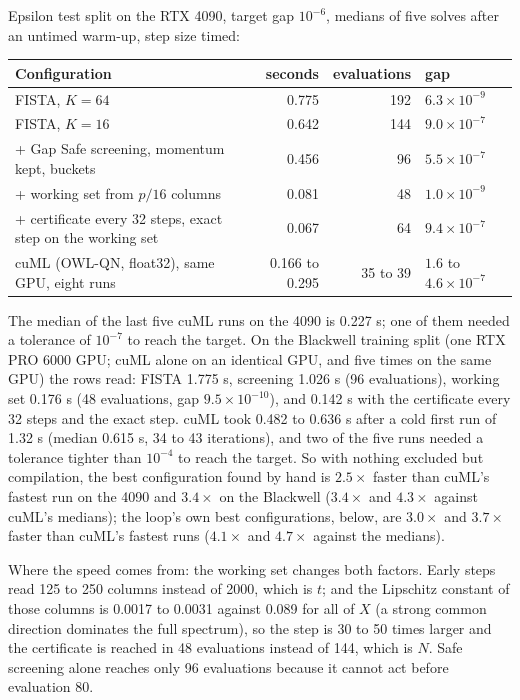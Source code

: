 Epsilon test split on the RTX 4090, target gap $10^{-6}$, medians of five
solves after an untimed warm-up, step size timed:

\begin{center}
\small
\begin{tabular}{lrrl}
\toprule
Configuration & seconds & evaluations & gap \\
\midrule
FISTA, $K=64$ & 0.775 & 192 & $6.3\times10^{-9}$ \\
FISTA, $K=16$ & 0.642 & 144 & $9.0\times10^{-7}$ \\
\quad + Gap Safe screening, momentum kept, buckets & 0.456 & 96 & $5.5\times10^{-7}$ \\
\quad + working set from $p/16$ columns & 0.081 & 48 & $1.0\times10^{-9}$ \\
\quad + certificate every 32 steps, exact step on the working set & 0.067 & 64 & $9.4\times10^{-7}$ \\
cuML (OWL-QN, float32), same GPU, eight runs & 0.166 to 0.295 & 35 to 39 & $1.6$ to $4.6\times10^{-7}$ \\
\bottomrule
\end{tabular}
\end{center}

The median of the last five cuML runs on the 4090 is 0.227 s; one of them
needed a tolerance of $10^{-7}$ to reach the target. On the Blackwell training
split (one RTX PRO 6000 GPU; cuML alone on an identical GPU, and five times on
the same GPU) the rows read: FISTA 1.775 s, screening 1.026 s (96 evaluations),
working set 0.176 s (48 evaluations, gap $9.5\times10^{-10}$), and 0.142 s with
the certificate every 32 steps and the exact step. cuML took 0.482 to 0.636 s
after a cold first run of 1.32 s (median 0.615 s, 34 to 43 iterations), and two
of the five runs needed a tolerance tighter than $10^{-4}$ to reach the target.
So with nothing excluded but compilation, the best configuration found by hand
is $2.5\times$ faster than cuML's fastest run on the 4090 and $3.4\times$ on the
Blackwell ($3.4\times$ and $4.3\times$ against cuML's medians); the loop's own best
configurations, below, are $3.0\times$ and $3.7\times$ faster than cuML's fastest runs
($4.1\times$ and $4.7\times$ against the medians).

Where the speed comes from: the working set changes both factors. Early steps
read 125 to 250 columns instead of 2000, which is $t$; and the Lipschitz
constant of those columns is 0.0017 to 0.0031 against 0.089 for all of $X$ (a
strong common direction dominates the full spectrum), so the step is 30 to 50
times larger and the certificate is reached in 48 evaluations instead of 144,
which is $N$. Safe screening alone reaches only 96 evaluations because it
cannot act before evaluation 80.

